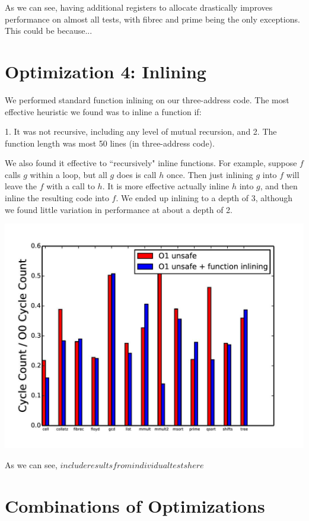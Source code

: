 \documentclass{article}
\begin{document}
As we can see, having additional registers to allocate drastically improves performance on almost all tests, with fibrec and prime being the only exceptions. This could be because...


\section{Optimization 4: Inlining}

We performed standard function inlining on our three-address code. The most effective heuristic we found was to inline a function if:

1. It was not recursive, including any level of mutual recursion, and
2. The function length was most 50 lines (in three-address code).

We also found it effective to ``recursively" inline functions. For example, suppose $f$ calls $g$ within a loop, but all $g$ does is call $h$ once. Then just inlining $g$ into $f$ will leave the $f$ with a call to $h$. It is more effective actually inline $h$ into $g$, and then inline the resulting code into $f$. We ended up inlining to a depth of 3, although we found little variation in performance at about a depth of 2.

\includegraphics[scale=0.5]{O1_vs_inlining-page-001}

As we can see, $include results from individual tests here$


\section{Combinations of Optimizations}
\end{document}
